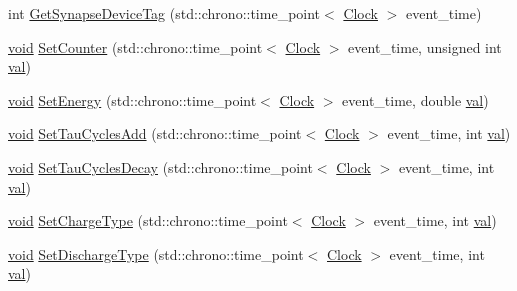 \begin{DoxyCompactItemize}
\item 
int \mbox{\hyperlink{class_synapse_a4fe6b49e46ebda6f34593d3df54d5593}{Get\+Synapse\+Device\+Tag}} (std\+::chrono\+::time\+\_\+point$<$ \mbox{\hyperlink{universe_8h_a0ef8d951d1ca5ab3cfaf7ab4c7a6fd80}{Clock}} $>$ event\+\_\+time)
\item 
\mbox{\hyperlink{glad_8h_a950fc91edb4504f62f1c577bf4727c29}{void}} \mbox{\hyperlink{class_synapse_aa1a990a7b89fbeaf1109a8b70d86111b}{Set\+Counter}} (std\+::chrono\+::time\+\_\+point$<$ \mbox{\hyperlink{universe_8h_a0ef8d951d1ca5ab3cfaf7ab4c7a6fd80}{Clock}} $>$ event\+\_\+time, unsigned int \mbox{\hyperlink{glad_8h_a26942fd2ed566ef553eae82d2c109c8f}{val}})
\item 
\mbox{\hyperlink{glad_8h_a950fc91edb4504f62f1c577bf4727c29}{void}} \mbox{\hyperlink{class_synapse_aa90b66763c8aca2ad8df535ffed5d4a9}{Set\+Energy}} (std\+::chrono\+::time\+\_\+point$<$ \mbox{\hyperlink{universe_8h_a0ef8d951d1ca5ab3cfaf7ab4c7a6fd80}{Clock}} $>$ event\+\_\+time, double \mbox{\hyperlink{glad_8h_a26942fd2ed566ef553eae82d2c109c8f}{val}})
\item 
\mbox{\hyperlink{glad_8h_a950fc91edb4504f62f1c577bf4727c29}{void}} \mbox{\hyperlink{class_synapse_afbd7a2e7e6353b3e743ec100fe615e84}{Set\+Tau\+Cycles\+Add}} (std\+::chrono\+::time\+\_\+point$<$ \mbox{\hyperlink{universe_8h_a0ef8d951d1ca5ab3cfaf7ab4c7a6fd80}{Clock}} $>$ event\+\_\+time, int \mbox{\hyperlink{glad_8h_a26942fd2ed566ef553eae82d2c109c8f}{val}})
\item 
\mbox{\hyperlink{glad_8h_a950fc91edb4504f62f1c577bf4727c29}{void}} \mbox{\hyperlink{class_synapse_a5bbee6bb7dc49c90b7c3413d02e06cc8}{Set\+Tau\+Cycles\+Decay}} (std\+::chrono\+::time\+\_\+point$<$ \mbox{\hyperlink{universe_8h_a0ef8d951d1ca5ab3cfaf7ab4c7a6fd80}{Clock}} $>$ event\+\_\+time, int \mbox{\hyperlink{glad_8h_a26942fd2ed566ef553eae82d2c109c8f}{val}})
\item 
\mbox{\hyperlink{glad_8h_a950fc91edb4504f62f1c577bf4727c29}{void}} \mbox{\hyperlink{class_synapse_a87fb31c2758d8fc26e8f2cf4fd7d1af5}{Set\+Charge\+Type}} (std\+::chrono\+::time\+\_\+point$<$ \mbox{\hyperlink{universe_8h_a0ef8d951d1ca5ab3cfaf7ab4c7a6fd80}{Clock}} $>$ event\+\_\+time, int \mbox{\hyperlink{glad_8h_a26942fd2ed566ef553eae82d2c109c8f}{val}})
\item 
\mbox{\hyperlink{glad_8h_a950fc91edb4504f62f1c577bf4727c29}{void}} \mbox{\hyperlink{class_synapse_a1956d553c15fa1aea12d39725baeca1b}{Set\+Discharge\+Type}} (std\+::chrono\+::time\+\_\+point$<$ \mbox{\hyperlink{universe_8h_a0ef8d951d1ca5ab3cfaf7ab4c7a6fd80}{Clock}} $>$ event\+\_\+time, int \mbox{\hyperlink{glad_8h_a26942fd2ed566ef553eae82d2c109c8f}{val}})

\end{DoxyCompactItemize}
